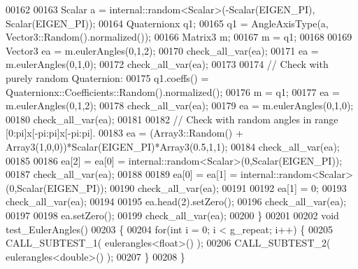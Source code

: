 \begin{DoxyCode}
00162 
00163   Scalar a = internal::random<Scalar>(-Scalar(EIGEN\_PI), Scalar(EIGEN\_PI));
00164   Quaternionx q1;
00165   q1 = AngleAxisType(a, Vector3::Random().normalized());
00166   Matrix3 m;
00167   m = q1;
00168   
00169   Vector3 ea = m.eulerAngles(0,1,2);
00170   check\_all\_var(ea);
00171   ea = m.eulerAngles(0,1,0);
00172   check\_all\_var(ea);
00173   
00174   \textcolor{comment}{// Check with purely random Quaternion:}
00175   q1.coeffs() = Quaternionx::Coefficients::Random().normalized();
00176   m = q1;
00177   ea = m.eulerAngles(0,1,2);
00178   check\_all\_var(ea);
00179   ea = m.eulerAngles(0,1,0);
00180   check\_all\_var(ea);
00181   
00182   \textcolor{comment}{// Check with random angles in range [0:pi]x[-pi:pi]x[-pi:pi].}
00183   ea = (Array3::Random() + Array3(1,0,0))*Scalar(EIGEN\_PI)*Array3(0.5,1,1);
00184   check\_all\_var(ea);
00185   
00186   ea[2] = ea[0] = internal::random<Scalar>(0,Scalar(EIGEN\_PI));
00187   check\_all\_var(ea);
00188   
00189   ea[0] = ea[1] = internal::random<Scalar>(0,Scalar(EIGEN\_PI));
00190   check\_all\_var(ea);
00191   
00192   ea[1] = 0;
00193   check\_all\_var(ea);
00194   
00195   ea.head(2).setZero();
00196   check\_all\_var(ea);
00197   
00198   ea.setZero();
00199   check\_all\_var(ea);
00200 \}
00201 
00202 \textcolor{keywordtype}{void} test\_EulerAngles()
00203 \{
00204   \textcolor{keywordflow}{for}(\textcolor{keywordtype}{int} i = 0; i < g\_repeat; i++) \{
00205     CALL\_SUBTEST\_1( eulerangles<float>() );
00206     CALL\_SUBTEST\_2( eulerangles<double>() );
00207   \}
00208 \}
\end{DoxyCode}
